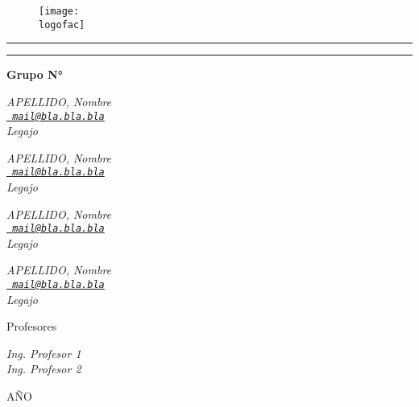 
\begin{titlepage}
    \centering
    \begin{figure}[t]
        \centering
        \texttt{[image: \\logofac]}
    \end{figure}    
    {\bfseries\Large{\universidad}\par}
    \vskip 0.5cm
    {\sc\Large{\carrera}\par}
    \vskip 0.6cm
    {\sc\LARGE{\materia}\par}
    \vskip 0.75cm
    \rule{\textwidth}{0.5pt}
    \vskip 0.5cm
    {\Large{\unidad}\par}
    \vskip 0.35cm
    {\bfseries\LARGE{\titulo}\par}
    \vskip 0.5cm
    \rule{\textwidth}{0.5pt}
    
    \vskip 1cm   
    
    {\bfseries\Large{Grupo N° \grupo}\par}
    \vskip 1cm 
    \begin{center}
    \begin{minipage}[b]{0.49\textwidth}
    \centering \slshape
    APELLIDO, Nombre\\[0.3ex]
    \href{mailto:	mail@bla.bla.bla}{\texttt{ mail@bla.bla.bla}}\\[0.3ex]
    Legajo
    \end{minipage}
    \begin{minipage}[b]{0.49\textwidth}
    \centering \slshape
    APELLIDO, Nombre\\[0.3ex]
    \href{mailto:	mail@bla.bla.bla}{\texttt{ mail@bla.bla.bla}}\\[0.3ex]
    Legajo
    \end{minipage}
    \vskip 0.8cm
    \begin{minipage}[b]{0.49\textwidth}
    \centering \slshape
    APELLIDO, Nombre\\[0.3ex]
    \href{mailto:	mail@bla.bla.bla}{\texttt{ mail@bla.bla.bla}}\\[0.3ex]
    Legajo
    \end{minipage}
    \begin{minipage}[b]{0.49\textwidth}
    \centering \slshape
    APELLIDO, Nombre\\[0.3ex]
    \href{mailto:	mail@bla.bla.bla}{\texttt{ mail@bla.bla.bla}}\\[0.3ex]
    Legajo
    \end{minipage} 
    \end{center}
    
    \vfill
    
    {\Large{Profesores}\par}
    \begin{center}\slshape
    Ing. Profesor 1\\[1ex]
    Ing. Profesor 2\\[1ex]
    \end{center}
    \vskip 0.5cm
    {AÑO}\par
\end{titlepage}
